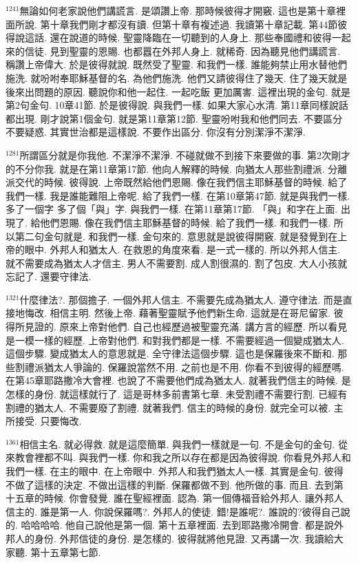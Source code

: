 \documentclass{book}
\begin{document}
$^{1241}$無論如何老家說他們講謊言.
是頌讚上帝.
那時候彼得才開竅.
這也是第十章裡面所說.
第十章我們剛才都沒有讀.
但第十章有複述過.
我讀第十章記載.
第44節彼得說這話.
還在說道的時候.
聖靈降臨在一切聽到的人身上.
那些奉國禮和彼得一起來的信徒.
見到聖靈的恩賜.
也都囂在外邦人身上.
就稀奇.
因為聽見他們講謊言.
稱讚上帝偉大.
於是彼得就說.
既然受了聖靈.
和我們一樣.
誰能夠禁止用水替他們施洗.
就吩咐奉耶穌基督的名.
為他們施洗.
他們又請彼得住了幾天.
住了幾天就是後來出問題的原因.
聽說你和他一起住.
一起吃飯 更加厲害.
這裡出現的金句.
就是第2句金句.
10章41節.
於是彼得說.
與我們一樣.
如果大家心水清.
第11章同樣說話都出現.
剛才說第1個金句.
就是第11章第12節.
聖靈吩咐我和他們同去.
不要區分 不要疑惑.
其實世治都是這樣說.
不要作出區分.
你沒有分別潔淨不潔淨.

$^{1281}$所謂區分就是你我他.
不潔淨不潔淨.
不碰就做不到接下來要做的事.
第2次剛才的不分你我.
就是在第11章第17節.
他向人解釋的時候.
向猶太人那些割禮派.
分離派交代的時候.
彼得說.
上帝既然給他們恩賜.
像在我們信主耶穌基督的時候.
給了我們一樣.
我是誰能難阻上帝呢.
給了我們一樣.
在第10章第47節.
就是與我們一樣.
多了一個字 多了個「與」字.
與我們一樣.
在第11章第17節.
「與」和字在上面.
出現了.
給他們恩賜.
像在我們信主耶穌基督的時候.
給了我們一樣.
和我們一樣.
所以第二句金句就是.
和我們一樣.
金句來的.
意思就是說彼得開竅.
就是發覺到在上帝的眼中.
外邦人和猶太人.
在救恩的角度來看.
是一式一樣的.
所以外邦人信主.
就不需要成為猶太人才信主.
男人不需要割.
成人割很濕的.
割了包皮.
大人小孩就忘記了.
還要守律法.

$^{1321}$什麼律法?.
那個擔子.
一個外邦人信主.
不需要先成為猶太人.
遵守律法.
而是直接地悔改.
相信主明.
然後上帝.
藉著聖靈賦予他們新生命.
這就是在哥尼留家.
彼得所見證的.
原來上帝對他們.
自己也經歷過被聖靈充滿.
講方言的經歷.
所以看見是一模一樣的經歷.
上帝對他們.
和對我們都是一樣.
不需要經過一個變成猶太人.
這個步驟.
變成猶太人的意思就是.
全守律法這個步驟.
這也是保羅後來不斷和.
那些割禮派猶太人爭論的.
保羅說當然不用.
之前也是不用.
你看不到彼得的經歷嗎.
在第45章耶路撒冷大會裡.
也說了不需要他們成為猶太人.
就著我們信主的時候.
是怎樣的身份.
就這樣就行了.
這是哥林多前書第七章.
未受割禮不需要行割.
已經有割禮的猶太人.
不需要廢了割禮.
就著我們.
信主的時候的身份.
就完全可以被.
主所接受.
只要悔改.

$^{1361}$相信主名.
就必得救.
就是這麼簡單.
與我們一樣就是一句.
不是金句的金句.
從來教會裡都不叫.
與我們一樣.
你和我之所以存在都是因為彼得說.
你看見外邦人和我們一樣.
在主的眼中.
在上帝眼中.
外邦人和我們猶太人一樣.
其實是金句.
彼得不做了這樣的決定.
不做出這樣的判斷.
保羅都做不到.
他所做的事.
而且.
去到第十五章的時候.
你會發覺.
誰在聖經裡面.
認為.
第一個傳福音給外邦人.
讓外邦人信主的.
誰是第一人.
你說保羅嗎?.
外邦人的使徒.
錯!是誰呢?.
誰說的?彼得自己說的.
哈哈哈哈.
他自己說他是第一個.
第十五章裡面.
去到耶路撒冷開會.
都是說外邦人的身份.
外邦信徒的身份.
是怎樣的.
彼得就將他見證.
又再講一次.
我讀給大家聽.
第十五章第七節.
\end{document}
